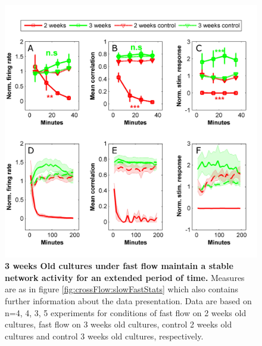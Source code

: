         \begin{figure}[!htb]
            \centering
            \includegraphics[width=15cm]{chapter5/figures/youngOldStats/youngOldGraphs.jpg}
            \caption[Averaged time course of activity measures in young versus old cultures under flow]{\textbf{3 weeks Old cultures under fast flow maintain a stable network activity for an extended period of time.} Measures are as in figure \ref{fig:crossFlow:slowFastStats} which also contains further information about the data presentation. Data are based on n=4, 4, 3, 5 experiments for conditions of fast flow on 2 weeks old cultures, fast flow on 3 weeks old cultures, control 2 weeks old cultures and control 3 weeks old cultures, respectively.}
            \label{fig:crossFlow:youngOldStats}
        \end{figure}

